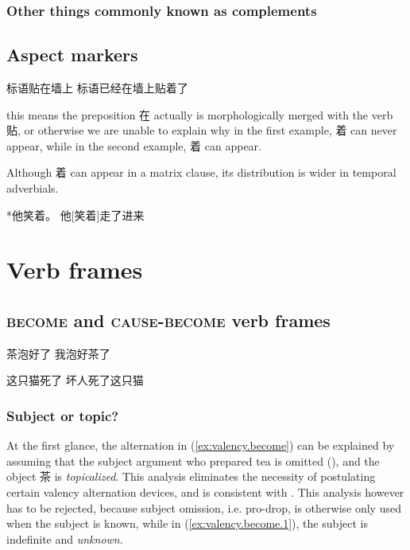 \documentclass[UTF8, a4paper, oneside, scheme=plain, 12pt]{ctexrep}
\newcommand*{\category}[1]{\textsc{#1}}
\begin{document}
\subsection{Other things commonly known as complements}

\section{Aspect markers}

\begin{exe}
    \ex 标语贴在墙上 
    \ex 标语已经在墙上贴着了
\end{exe}
 
this means the preposition 在 actually is morphologically merged with the verb 贴, 
or otherwise we are unable to explain why 
in the first example, 着 can never appear, 
while in the second example, 着 can appear.

Although 着 can appear in a matrix clause, 
its distribution is wider in temporal adverbials. 

*他笑着。
他[笑着]走了进来

\chapter{Verb frames}\label{chap:verb-frames}

\section{\category{become} and \category{cause}-\category{become} verb frames}

\begin{exe}
    \ex\label{ex:valency.become} \begin{xlist}
        \ex\label{ex:valency.become.1} 茶泡好了
        \ex 我泡好茶了
    \end{xlist}

    \ex\label{ex:valency.become-only}
    \begin{xlist}
        \ex\label{ex:valency.become-only.1} 这只猫死了
        \ex *坏人死了这只猫
    \end{xlist}
\end{exe}

\subsection{Subject or topic?}\label{sec:valency.become.subject-or-topic}

At the first glance, the alternation in (\ref{ex:valency.become})
can be explained by assuming that the 
subject argument who prepared tea is omitted (),
and the object 茶 is \emph{topicalized}.
This analysis eliminates the necessity of postulating certain valency alternation devices,
and is consistent with \citet{lapolla20091}.
This analysis however has to be rejected,
because subject omission, i.e. pro-drop,
is otherwise only used when the subject is known,
while in (\ref{ex:valency.become.1}),
the subject is indefinite and \emph{unknown}.
\end{document}
